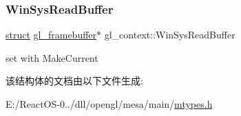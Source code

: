 \subsubsection{\texorpdfstring{Win\+Sys\+Read\+Buffer}{WinSysReadBuffer}}
{\footnotesize\ttfamily \hyperlink{interfacestruct}{struct} \hyperlink{structgl__framebuffer}{gl\+\_\+framebuffer}$\ast$ gl\+\_\+context\+::\+Win\+Sys\+Read\+Buffer}

set with Make\+Current 

该结构体的文档由以下文件生成\+:\begin{DoxyCompactItemize}
\item 
E\+:/\+React\+O\+S-\/0../dll/opengl/mesa/main/\hyperlink{mtypes_8h}{mtypes.\+h}\end{DoxyCompactItemize}

